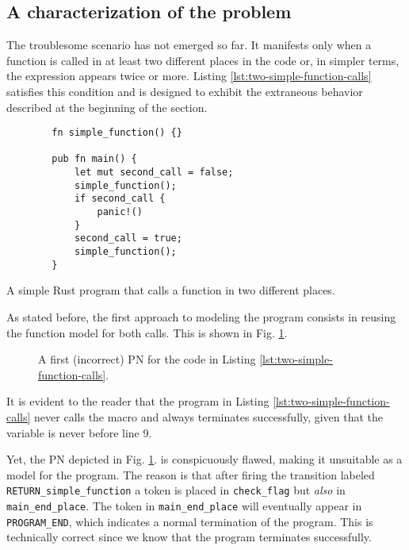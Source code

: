 \subsection{A characterization of the problem}

The troublesome scenario has not emerged so far.
It manifests only when a function is called
in at least two different places in the code or,
in simpler terms, the expression  appears twice or more.
Listing \ref{lst:two-simple-function-calls} satisfies this condition
and is designed to exhibit
the extraneous behavior described at the beginning of the section.

\begin{listing}
    \begin{verbatim}
        fn simple_function() {}

        pub fn main() {
            let mut second_call = false;
            simple_function();
            if second_call {
                panic!()
            }
            second_call = true;
            simple_function();
        }
    \end{verbatim}
    \caption{A simple Rust program that calls a function in two different places.}
    \label{lst:two-simple-function-calls}
\end{listing}

As stated before, the first approach to modeling the program consists
in reusing the function model for both calls.
This is shown in Fig. \ref{fig:two-function-calls-incorrect-1}.

\begin{figure}[!htbp]
    \centering
    
    \caption{A first (incorrect) \acrshort{PN} for the code
        in Listing \ref{lst:two-simple-function-calls}.}
    \label{fig:two-function-calls-incorrect-1}
\end{figure}

It is evident to the reader that
the program in Listing \ref{lst:two-simple-function-calls}
never calls the  macro and always terminates successfully,
given that the variable 
is never  before line 9.

Yet, the \acrshort{PN} depicted in Fig. \ref{fig:two-function-calls-incorrect-1}.
is conspicuously flawed, making it unsuitable as a model for the program.
The reason is that after firing the transition labeled \texttt{RETURN\_simple\_function}
a token is placed in \texttt{check\_flag} but \emph{also} in \texttt{main\_end\_place}.
The token in \texttt{main\_end\_place} will eventually appear in \texttt{PROGRAM\_END},
which indicates a normal termination of the program.
This is technically correct since we know that the program terminates successfully.

